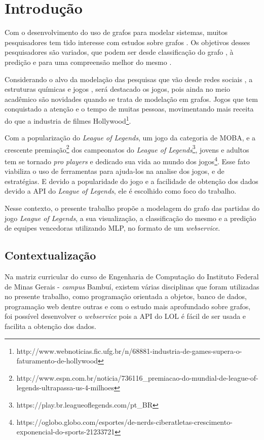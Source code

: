\chapter{Introdução}
\label{chap:Introducao}

Com o desenvolvimento do uso de grafos para modelar sistemas, muitos pesquisadores tem tido interesse com estudos sobre grafos \cite{joachim}.
Os objetivos desses pesquisadores são variados, que podem ser desde classificação do grafo \cite{fbclass}, à predição \cite{dota} e para uma compreensão melhor do mesmo \cite{rosvall2008maps}. 

Considerando o alvo da modelação das pesquisas que vão desde redes sociais \cite{fbclass}, a estruturas químicas \cite{rosvall2008maps} e jogos \cite{dota}, será destacado os jogos, pois ainda no meio acadêmico são novidades quando se trata de modelação em grafos.
Jogos que tem conquistado a atenção e o tempo de muitas pessoas, movimentando mais receita do que a industria de filmes Hollywood\footnote{http://www.webnoticias.fic.ufg.br/n/68881-industria-de-games-supera-o-faturamento-de-hollywood}.

Com a popularização do \textit{League of Legends}, um jogo da categoria de MOBA, e a crescente premiação\footnote{http://www.espn.com.br/noticia/736116\_premiacao-do-mundial-de-league-of-legends-ultrapassa-us-4-milhoes} dos campeonatos do \textit{League of Legends}\footnote{https://play.br.leagueoflegends.com/pt\_BR}, jovens e adultos tem se tornado \textit{pro players} e dedicado sua vida ao mundo dos jogos\footnote{https://oglobo.globo.com/esportes/de-nerds-ciberatletas-crescimento-exponencial-do-sports-21233721}. 
Esse fato viabiliza o uso de ferramentas para ajuda-los na analise dos jogos, e de estratégias. 
E devido a popularidade do jogo e a facilidade de obtenção dos dados devido a API do \textit{League of Legends}, ele é escolhido como foco do trabalho.

Nesse contexto, o presente trabalho propõe a modelagem do grafo das partidas do jogo \textit{League of Legends}, a sua visualização, a classificação do mesmo e a predição de equipes vencedoras utilizando MLP, no formato de um \textit{webservice}.

\section{Contextualização}
Na matriz curricular do curso de Engenharia de Computação do Instituto Federal de Minas Gerais - \textit{campus} Bambuí, existem várias disciplinas que foram utilizadas no presente trabalho, como programação orientada a objetos, banco de dados, programação web dentre outras e com o estudo mais aprofundado sobre grafos, foi possível desenvolver o \textit{webservice} pois a API do LOL é fácil de ser usada e facilita a obtenção dos dados.


